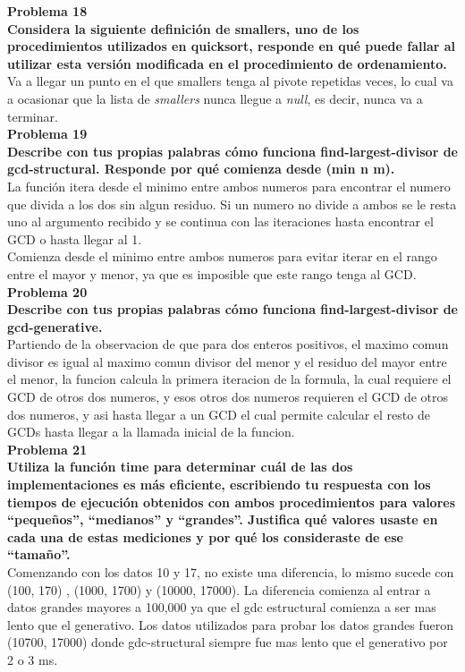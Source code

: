 \documentclass[a4paper]{article}
\begin{document}
\textbf{Problema 18\\
Considera la siguiente definición de smallers, uno de los procedimientos utilizados en quicksort, responde en qué puede fallar al utilizar esta versión modificada en el procedimiento de ordenamiento.}\\
Va a llegar un punto en el que smallers tenga al pivote repetidas veces, lo cual va a ocasionar que la lista de \textit{smallers} nunca llegue a \textit{null}, es decir, nunca va a terminar.\\
\textbf{Problema 19\\
Describe con tus propias palabras cómo funciona find-largest-divisor de gcd-structural. Responde por qué comienza desde (min n m).}\\
La función itera desde el minimo entre ambos numeros para encontrar el numero que divida a los dos sin algun residuo. Si un numero no divide a ambos se le resta uno al argumento recibido y se continua con las iteraciones hasta encontrar el GCD o hasta llegar al 1.\\
Comienza desde el minimo entre ambos numeros para evitar iterar en el rango entre el mayor y menor, ya que es imposible que este rango tenga al GCD.\\
\textbf{Problema 20\\
Describe con tus propias palabras cómo funciona find-largest-divisor de gcd-generative.}\\
Partiendo de la observacion de que para dos enteros positivos, el maximo comun divisor es igual al maximo comun divisor del menor y el residuo del mayor entre el menor, la funcion calcula la primera iteracion de la formula, la cual requiere el GCD de otros dos numeros, y esos otros dos numeros requieren el GCD de otros dos numeros, y asi hasta llegar a un GCD el cual permite calcular el resto de GCDs hasta llegar a la llamada inicial de la funcion.\\
\textbf{Problema 21\\
Utiliza la función time para determinar cuál de las dos implementaciones es más eficiente, escribiendo tu respuesta con los tiempos de ejecución obtenidos con ambos procedimientos para valores “pequeños”, “medianos” y “grandes”. Justifica qué valores usaste en cada una de estas mediciones y por qué los consideraste de ese “tamaño”.}\\
Comenzando con los datos 10 y 17, no existe una diferencia, lo mismo sucede con (100, 170) , (1000, 1700) y (10000, 17000). La diferencia comienza al entrar a datos grandes mayores a 100,000 ya que el gdc estructural comienza a ser mas lento que el generativo. Los datos utilizados para probar los datos grandes fueron (10700, 17000) donde gdc-structural siempre fue mas lento que el generativo por 2 o 3 ms.\\
\end{document}
